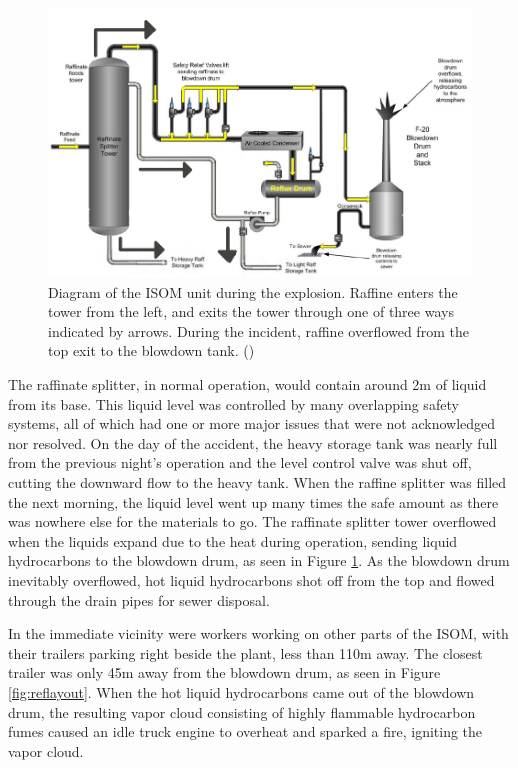\documentclass[12pt]{article}
\begin{document}
	\begin{figure}[H]
		
		\includegraphics[width=\textwidth]{BP_Texas_City_incident_diagram.png}
		\caption{Diagram of the ISOM unit during the explosion. Raffine enters the tower from the left, and exits the tower through one of three ways indicated by arrows. During the incident, raffine overflowed from the top exit to the blowdown tank. (\cite{BPreport})}
		\label{fig:ISOMUnit}
	\end{figure}

	The raffinate splitter, in normal operation, would contain around 2m of liquid from its base. This liquid level was controlled by many overlapping safety systems, all of which had one or more major issues that were not acknowledged nor resolved. On the day of the accident, the heavy storage tank was nearly full from the previous night's operation and the level control valve was shut off, cutting the downward flow to the heavy tank. When the raffine splitter was filled the next morning, the liquid level went up many times the safe amount as there was nowhere else for the materials to go. The raffinate splitter tower overflowed when the liquids expand due to the heat during operation, sending liquid hydrocarbons to the blowdown drum, as seen in Figure \ref{fig:ISOMUnit}. As the blowdown drum inevitably overflowed, hot liquid hydrocarbons shot off from the top and flowed through the drain pipes for sewer disposal.

	In the immediate vicinity were workers working on other parts of the ISOM, with their trailers parking right beside the plant, less than 110m away. The closest trailer was only 45m away from the blowdown drum, as seen in Figure \ref{fig:reflayout}. When the hot liquid hydrocarbons came out of the blowdown drum, the resulting vapor cloud consisting of highly flammable hydrocarbon fumes caused an idle truck engine to overheat and sparked a fire, igniting the vapor cloud. 
	
\end{document}
